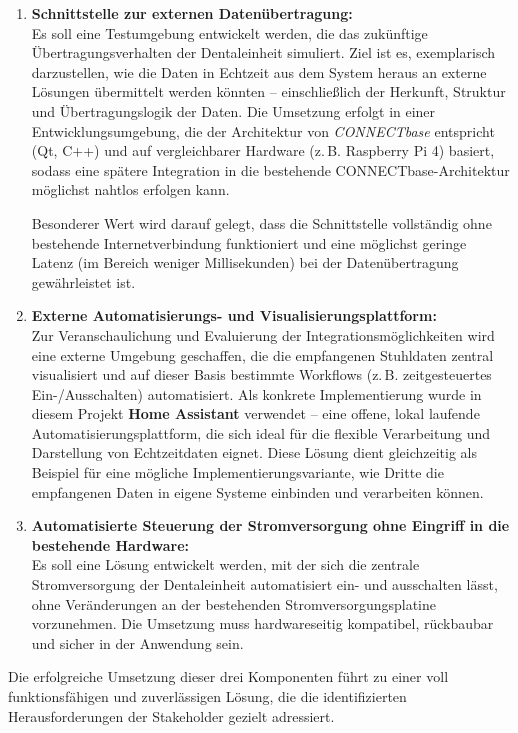 \begin{enumerate}
    \item \textbf{Schnittstelle zur externen Datenübertragung:} \\
    Es soll eine Testumgebung entwickelt werden, die das zukünftige Übertragungsverhalten der Dentaleinheit simuliert. Ziel ist es, exemplarisch darzustellen, wie die Daten in Echtzeit aus dem System heraus an externe Lösungen übermittelt werden könnten – einschließlich der Herkunft, Struktur und Übertragungslogik der Daten. Die Umsetzung erfolgt in einer Entwicklungsumgebung, die der Architektur von \textit{CONNECTbase} entspricht (Qt, C++) und auf vergleichbarer Hardware (z.\,B. Raspberry Pi 4) basiert, sodass eine spätere Integration in die bestehende CONNECTbase-Architektur möglichst nahtlos erfolgen kann.

    Besonderer Wert wird darauf gelegt, dass die Schnittstelle vollständig ohne bestehende Internetverbindung funktioniert und eine möglichst geringe Latenz (im Bereich weniger Millisekunden) bei der Datenübertragung gewährleistet ist.\\

    \item \textbf{Externe Automatisierungs- und Visualisierungsplattform:} \\
    Zur Veranschaulichung und Evaluierung der Integrationsmöglichkeiten wird eine externe Umgebung geschaffen, die die empfangenen Stuhldaten zentral visualisiert und auf dieser Basis bestimmte Workflows (z.\,B. zeitgesteuertes Ein-/Ausschalten) automatisiert. Als konkrete Implementierung wurde in diesem Projekt \textbf{Home Assistant} verwendet – eine offene, lokal laufende Automatisierungsplattform, die sich ideal für die flexible Verarbeitung und Darstellung von Echtzeitdaten eignet. Diese Lösung dient gleichzeitig als Beispiel für eine mögliche Implementierungsvariante, wie Dritte die empfangenen Daten in eigene Systeme einbinden und verarbeiten können.\\

    \item \textbf{Automatisierte Steuerung der Stromversorgung ohne Eingriff in die bestehende Hardware:} \\
    Es soll eine Lösung entwickelt werden, mit der sich die zentrale Stromversorgung der Dentaleinheit automatisiert ein- und ausschalten lässt, ohne Veränderungen an der bestehenden Stromversorgungsplatine vorzunehmen. Die Umsetzung muss hardwareseitig kompatibel, rückbaubar und sicher in der Anwendung sein.
\end{enumerate}

Die erfolgreiche Umsetzung dieser drei Komponenten führt zu einer voll funktionsfähigen und zuverlässigen Lösung, die die identifizierten Herausforderungen der Stakeholder gezielt adressiert.

